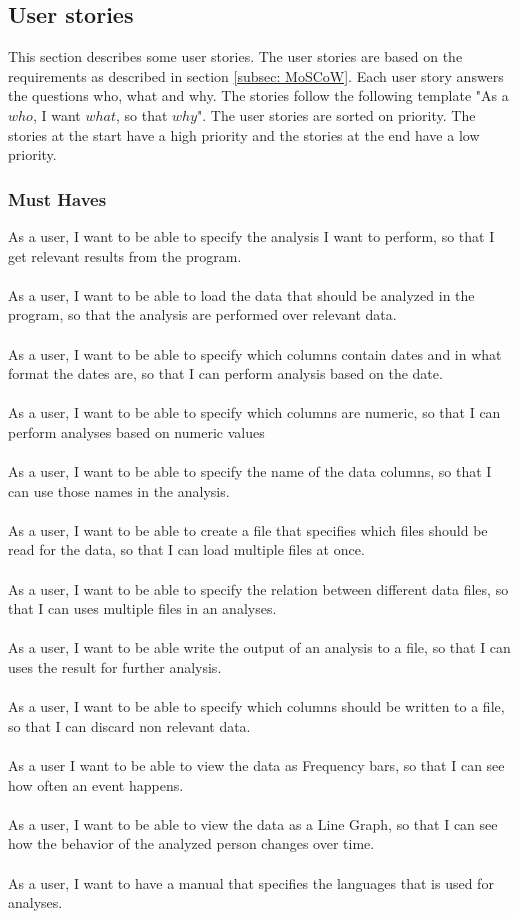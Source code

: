\subsection{User stories}
\label{subsec:User-stories}
This section describes some user stories. The user stories are based on the requirements as described in section \ref{subsec: MoSCoW}. Each user story answers the questions who, what and why. The stories follow the following template "As a $who$, I want $what$, so that $why$". The user stories are sorted on priority. The stories at the start have a high priority and the stories at the end have a low priority.
\subsubsection{Must Haves}
As a user, I want to be able to specify the analysis I want to perform, so that I get relevant results from the program. 
\\\\
As a user, I want to be able to load the data that should be analyzed in the program, so that the analysis are performed over relevant data. 
\\\\
As a user, I want to be able to specify which columns contain dates and in what format the dates are, so that I can perform analysis based on the date.
\\\\
As a user, I want to be able to specify which columns are numeric, so that I can perform analyses based on numeric values
\\\\
As a user, I want to be able to specify the name of the data columns, so that I can use those names in the analysis.
\\\\
As a user, I want to be able to create a file that specifies which files should be read for the data, so that I can load multiple files at once.
\\\\
As a user, I want to be able to specify the relation between different data files, so that I can uses multiple files in an analyses.
\\\\
As a user, I want to be able write the output of an analysis to a file, so that I can uses the result for further analysis.
\\\\
As a user, I want to be able to specify which columns should be written to a file, so that I can discard non relevant data.
\\\\
As a user I want to be able to view the data as Frequency bars, so that I can see how often an event happens.
\\\\
As a user, I want to be able to view the data as a Line Graph, so that I can see how the behavior of the analyzed person changes over time.
\\\\
As a user, I want to have a manual that specifies the languages that is used for analyses.

